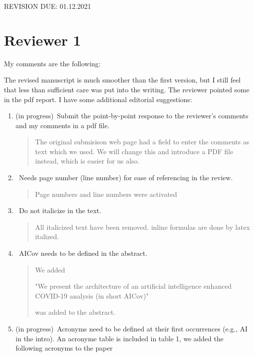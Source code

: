 \documentclass[12pt]{article}
\theoremstyle{definition}
\renewcommand{\_}{%
    \textunderscore\hspace{0pt}%
}
\newcommand{\DONE}{{\color{green!60!black}\makebox[0pt][l]{$\square$}\raisebox{.15ex}{\hspace{0.1em}$\checkmark$}}~}
\newcommand{\PROGRESS}{(in progress)~}
\begin{document}
% 

REVISION DUE: 01.12.2021

\section*{Reviewer 1}

My comments are the following:

The revised manuscript is much smoother than the first version, but I still feel that less than sufficient care was put into the writing. The reviewer pointed some in the pdf report. I have some additional editorial suggestions:

\begin{enumerate}

\item \PROGRESS Submit the point-by-point response to the reviewer's comments and my comments in a pdf file.

\begin{quote}
The original submisison web page had a field to enter the comments as text which we used. We will change this and introduce a PDF file instead, which is easier for us also.
\end{quote}



\item \DONE Needs page number (line number) for ease of referencing in the review.

\begin{quote}
Page numbers and line numbers were activated
\end{quote}


\item \DONE Do not italicize in the text.

\begin{quote}
All italicized text have been removed.
inline formulas are done by latex italized. 
\end{quote}


\item \DONE AICov needs to be defined in the abstract.

\begin{quote}
We added 

"We present the architecture of an artificial intelligence enhanced COVID-19 analysis (in short AICov)" 

was added to the abstract.
\end{quote}


\item \PROGRESS Acronyms need to be defined at their first occurrences (e.g., AI in the intro). An acronyme table is included in table 1, we added the following acronyms to the paper


\end{enumerate}
\end{document}
